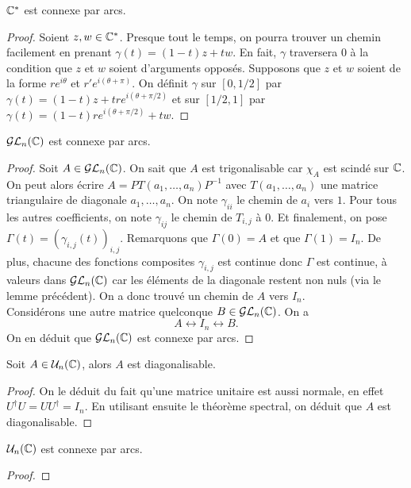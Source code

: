 \documentclass[../main.tex]{subfiles}
\begin{document}
\begin{lemma} \(\mathbb{C}^*\) est connexe par arcs.
\end{lemma}
\begin{proof}
    Soient \(z,w\in \mathbb{C}^*\). Presque tout le temps, on pourra trouver un chemin facilement en prenant \(\gamma(t) = (1-t)z + tw\). En fait, \(\gamma\) traversera \(0\)
    à la condition que \(z\) et \(w\) soient d'arguments opposés. Supposons que \(z\) et \(w\) soient de la forme \(re^{i\theta}\) et \(r'e^{i(\theta+\pi)}\).
    On définit \(\gamma\) sur \([0,1/2]\) par \(\gamma(t) = (1-t)z + tre^{i(\theta+\pi/2)}\) et sur \([1/2,1]\) par \(\gamma(t) = (1-t)re^{i(\theta+\pi/2)} + tw\). 
\end{proof}
\begin{proposition} \(\mathcal{GL}_n(\mathbb{C})\) est connexe par arcs.
\end{proposition}
\begin{proof}
    Soit \(A\in\mathcal{GL}_n(\mathbb{C})\). On sait que \(A\) est trigonalisable car \(\chi_A\) est scindé sur \(\mathbb{C}\).
    On peut alors écrire \(A = PT(a_1,\ldots,a_n)P^{-1}\) avec \(T(a_1,\ldots,a_n)\) une matrice triangulaire de diagonale \(a_1,\ldots,a_n\).
    On note \(\gamma_{ii}\) le chemin de \(a_i\) vers \(1\). Pour tous les autres coefficients, on note \(\gamma_{ij}\) le chemin de \(T_{i,j}\) à \(0\). Et finalement, on pose \(\Gamma(t) = (\gamma_{i,j}(t))_{i,j}\).
    Remarquons que \(\Gamma(0)= A\) et que \(\Gamma(1)=I_n\). De plus, chacune des fonctions composites \(\gamma_{i,j}\) est continue donc \(\Gamma\) est continue, à valeurs dans 
    \(\mathcal{GL}_n(\mathbb{C})\) car les éléments de la diagonale restent non nuls (via le lemme précédent). On a donc trouvé un chemin de \(A\) vers \(I_n\).\\

    Considérons une autre matrice quelconque \(B\in\mathcal{GL}_n(\mathbb{C})\). On a 
    \begin{equation}
        A \longleftrightarrow I_n \longleftrightarrow B.
    \end{equation}
    On en déduit que \(\mathcal{GL}_n(\mathbb{C})\) est connexe par arcs.
\end{proof}
\begin{lemma} Soit \(A \in \mathcal{U}_n(\mathbb{C})\), alors \(A\) est diagonalisable.
\end{lemma}
\begin{proof} On le déduit du fait qu'une matrice unitaire est aussi normale, en effet \(U^\dagger U = UU^\dagger = I_n\).
    En utilisant ensuite le théorème spectral, on déduit que \(A\) est diagonalisable.
\end{proof}
\begin{proposition} \(\mathcal{U}_n(\mathbb{C})\) est connexe par arcs.
\end{proposition}
\begin{proof}
\end{proof}
\end{document}
